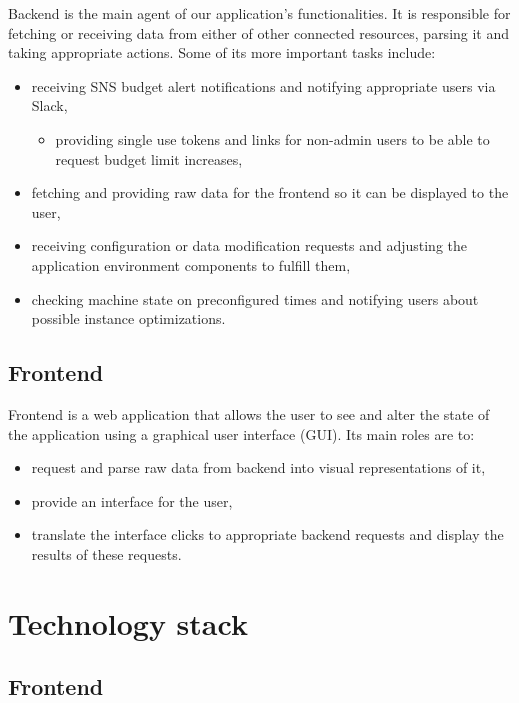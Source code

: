 \documentclass[licencjacka,en]{thesisclass}
\begin{document}
    Backend is the main agent of our application's functionalities.
    It is responsible for fetching or receiving data from either of other connected resources, parsing it and taking appropriate actions.
    Some of its more important tasks include:
    \begin{itemize}
        \item receiving SNS budget alert notifications and notifying appropriate users via Slack,
        \begin{itemize}
            \item providing single use tokens and links for non-admin users to be able to request budget limit increases,
        \end{itemize}
        \item fetching and providing raw data for the frontend so it can be displayed to the user,
        \item receiving configuration or data modification requests and adjusting the application environment components to fulfill them,
        \item checking machine state on preconfigured times and notifying users about possible instance optimizations.
    \end{itemize}

    \subsection{Frontend}
    Frontend is a web application that allows the user to see and alter the state of the application using a graphical user interface (GUI).
    Its main roles are to:
    \begin{itemize}
        \item request and parse raw data from backend into visual representations of it,
        \item provide an interface for the user,
        \item translate the interface clicks to appropriate backend requests and display the results of these requests.
    \end{itemize}

    \section{Technology stack}

    \subsection{Frontend}
\end{document}
